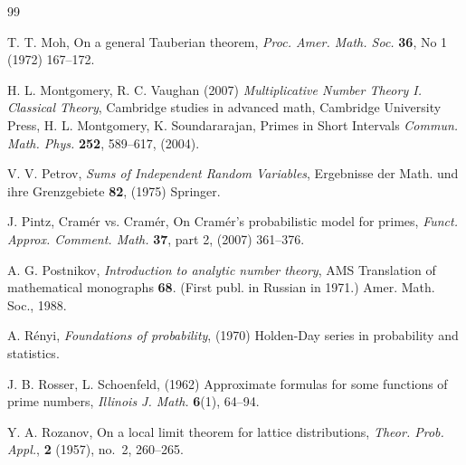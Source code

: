 \documentclass[11pt,draft,reqno]{amsart}
\theoremstyle{definition}
\theoremstyle{remarks}
\numberwithin{equation}{section}
\begin{document}
\begin{thebibliography}{99}
 

       T. T.  Moh,  On a general Tauberian theorem,  \emph{Proc. Amer. Math. Soc.} {\bf 36}, No 1 (1972) 167--172.

  {H. L.  Montgomery, R. C.  Vaughan} (2007) \emph{Multiplicative Number Theory I. 
 Classical Theory}, Cambridge studies in advanced math, Cambridge University Press, %
  {H. L.  Montgomery, K. Soundararajan}, Primes in Short Intervals \emph{Commun. Math. Phys.} {\bf 252}, 589--617, (2004).


  V. V.   Petrov,     \emph{Sums of Independent Random Variables}, Ergebnisse der Math. und ihre
 Grenzgebiete  {\bf 82}, (1975) Springer. 

    J. Pintz,    Cram\'er vs. Cram\'er,  On Cram\'er's probabilistic model for primes, \emph{Funct. Approx. Comment. Math.} {\bf 37}, part 2, (2007) 361--376.


 A. G. Postnikov,
\emph{Introduction to analytic number theory}, AMS Translation of mathematical monographs {\bf
68}. (First publ. in Russian in 1971.) Amer. Math. Soc., 1988.



  A. R\'enyi,   \emph{Foundations of probability}, (1970)
  Holden-Day series in probability and statistics.
 
 
   J. B. Rosser, L. Schoenfeld, (1962) Approximate formulas for some functions of prime numbers, \emph{Illinois J. Math.} {\bf 6}(1), 64--94.
  
   Y.  A. Rozanov,  
 On a local limit theorem for lattice distributions,
 \emph{Theor. Prob.   Appl.}, {\bf 2} (1957),  no.\ 2, 260--265.
 

\end{thebibliography}
\end{document}
